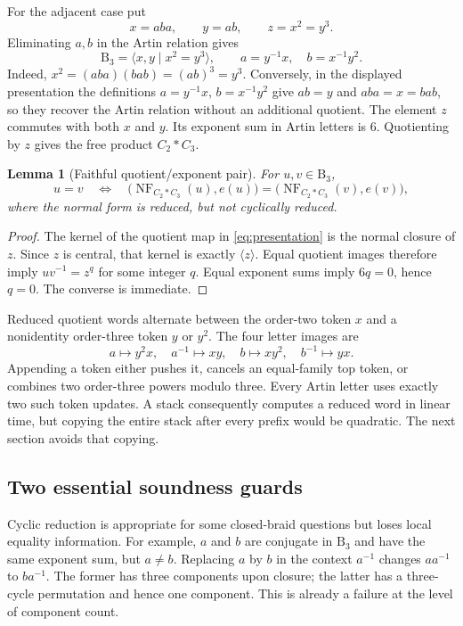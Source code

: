 \documentclass[11pt]{article}
\newtheorem{lemma}[theorem]{Lemma}
\theoremstyle{definition}
\theoremstyle{remark}
\newcommand{\B}{\mathrm B}
\newcommand{\NF}{\operatorname{NF}}
\begin{document}
For the adjacent case put
\[
 x=aba,\qquad y=ab,\qquad z=x^2=y^3.
\]
Eliminating $a,b$ in the Artin relation gives
\begin{equation}\label{eq:presentation}
 \B_3=\langle x,y\mid x^2=y^3\rangle,
 \qquad a=y^{-1}x,\quad b=x^{-1}y^2.
\end{equation}
Indeed, $x^2=(aba)(bab)=(ab)^3=y^3$. Conversely, in the displayed
presentation the definitions $a=y^{-1}x$, $b=x^{-1}y^2$ give $ab=y$ and
$aba=x=bab$, so they recover the Artin relation without an additional
quotient. The element $z$ commutes with both $x$ and $y$. Its exponent sum in Artin
letters is $6$. Quotienting by $z$ gives the free product $C_2*C_3$.

\begin{lemma}[Faithful quotient/exponent pair]\label{lem:faithful}
For $u,v\in\B_3$,
\[
 u=v\quad\Longleftrightarrow\quad
 \bigl(\NF_{C_2*C_3}(u),e(u)\bigr)
 =\bigl(\NF_{C_2*C_3}(v),e(v)\bigr),
\]
where the normal form is reduced, but \emph{not cyclically reduced}.
\end{lemma}
\begin{proof}
The kernel of the quotient map in \eqref{eq:presentation} is the normal
closure of $z$. Since $z$ is central, that kernel is exactly $\langle z\rangle$.
Equal quotient images therefore imply $uv^{-1}=z^q$ for some integer $q$.
Equal exponent sums imply $6q=0$, hence $q=0$. The converse is immediate.
\end{proof}

Reduced quotient words alternate between the order-two token $x$ and a
nonidentity order-three token $y$ or $y^2$. The four letter images are
\begin{equation}\label{eq:images}
 a\mapsto y^2x,\quad a^{-1}\mapsto xy,\quad
 b\mapsto xy^2,\quad b^{-1}\mapsto yx.
\end{equation}
Appending a token either pushes it, cancels an equal-family top token, or
combines two order-three powers modulo three. Every Artin letter uses exactly
two such token updates. A stack consequently computes a reduced word in
linear time, but copying the entire stack after every prefix would be
quadratic. The next section avoids that copying.

\subsection{Two essential soundness guards}
Cyclic reduction is appropriate for some closed-braid questions but loses
local equality information. For example, $a$ and $b$ are conjugate in $\B_3$
and have the same exponent sum, but $a\ne b$. Replacing $a$ by $b$ in the
context $a^{-1}$ changes $aa^{-1}$ to $ba^{-1}$. The former has three
components upon closure; the latter has a three-cycle permutation and hence
one component. This is already a failure at the level of component count.
\end{document}
